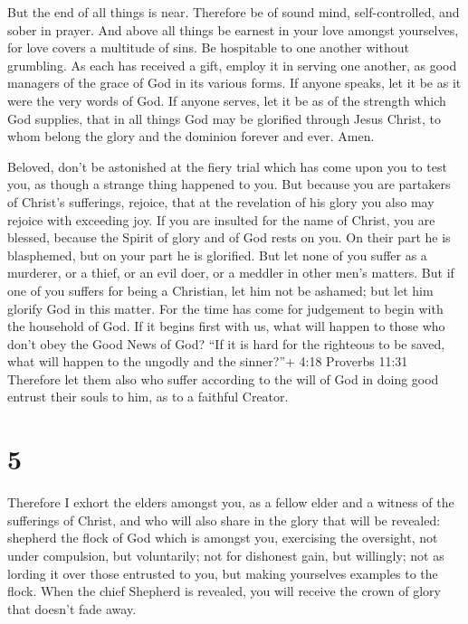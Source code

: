  But the end of all things is near. Therefore be of sound
mind, self-controlled, and sober in prayer.  And above all
things be earnest in your love amongst yourselves, for love covers a
multitude of sins.  Be hospitable to one another without
grumbling.  As each has received a gift, employ it in
serving one another, as good managers of the grace of God in its various
forms.  If anyone speaks, let it be as it were the very
words of God. If anyone serves, let it be as of the strength which God
supplies, that in all things God may be glorified through Jesus Christ,
to whom belong the glory and the dominion forever and ever. Amen.

 Beloved, don't be astonished at the fiery trial which has
come upon you to test you, as though a strange thing happened to you.
 But because you are partakers of Christ's sufferings,
rejoice, that at the revelation of his glory you also may rejoice with
exceeding joy.  If you are insulted for the name of Christ,
you are blessed, because the Spirit of glory and of God rests on you. On
their part he is blasphemed, but on your part he is glorified.
 But let none of you suffer as a murderer, or a thief, or
an evil doer, or a meddler in other men's matters.  But if
one of you suffers for being a Christian, let him not be ashamed; but
let him glorify God in this matter.  For the time has come
for judgement to begin with the household of God. If it begins first
with us, what will happen to those who don't obey the Good News of God?
 ``If it is hard for the righteous to be saved, what will
happen to the ungodly and the sinner?''+ 4:18 Proverbs 11:31
 Therefore let them also who suffer according to the will
of God in doing good entrust their souls to him, as to a faithful
Creator.

\hypertarget{section-4}{%
\section{5}\label{section-4}}

 Therefore I exhort the elders amongst you, as a fellow
elder and a witness of the sufferings of Christ, and who will also share
in the glory that will be revealed:  shepherd the flock of
God which is amongst you, exercising the oversight, not under
compulsion, but voluntarily; not for dishonest gain, but willingly;
 not as lording it over those entrusted to you, but making
yourselves examples to the flock.  When the chief Shepherd
is revealed, you will receive the crown of glory that doesn't fade away.

